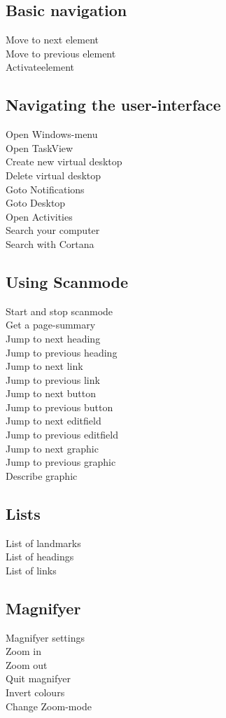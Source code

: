 \documentclass[a4paper, landscape, 11pt]{scrartcl}
\newcommand{\command}[2]{#1~\dotfill{}~#2\\} %
\begin{document}
\begin{multicols}{2}
\subsection*{Basic navigation}
\command{Move to next element}{}
\command{Move to previous element}{}
\command{Activateelement}{}

\subsection*{Navigating the user-interface}
\command{Open Windows-menu}{\keys{\faWindows}}
\command{Open TaskView}{\keys{\faWindows + \tab}}
\command{Create new virtual desktop}{\keys{\faWindows + \ctrl + d}}
\command{Delete virtual desktop}{}
\command{Goto Notifications}{}
\command{Goto Desktop}{}
\command{Open Activities}{}
\command{Search your computer}{}
\command{Search with Cortana}{}

\subsection*{Using Scanmode}
\command{Start and stop scanmode}{}
\command{Get a page-summary}{}
\command{Jump to next heading}{}
\command{Jump to previous heading}{}
\command{Jump to next link}{}
\command{Jump to previous link}{}
\command{Jump to next button}{}
\command{Jump to previous button}{}
\command{Jump to next editfield}{}
\command{Jump to previous editfield}{}
\command{Jump to next graphic}{}
\command{Jump to previous graphic}{}
\command{Describe graphic}{}

\subsection*{Lists}
\command{List of landmarks}{}
\command{List of headings}{}
\command{List of links}{}

\subsection*{Magnifyer}
\command{Magnifyer settings}{}
\command{Zoom in}{\keys{\faWindows + {+}}}
\command{Zoom out}{\keys{\faWindows + {-}}}
\command{Quit magnifyer}{\keys{\faWindows + \esc}}
\command{Invert colours}{}
\command{Change Zoom-mode}{}

\end{multicols}

\hrulefill{}
\end{document}
